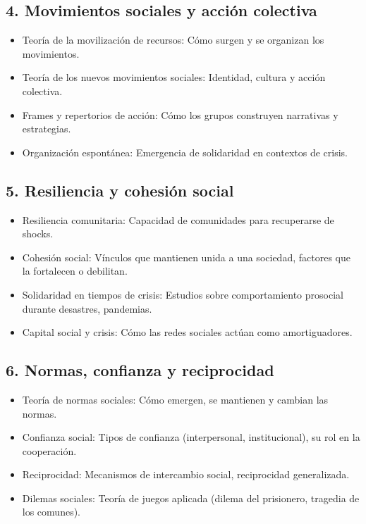 \documentclass[a4paper,11pt]{article}
\begin{document}
\subsection*{4. Movimientos sociales y acción colectiva}
\begin{itemize}[leftmargin=*, label=--]
    \item Teoría de la movilización de recursos: Cómo surgen y se organizan los movimientos.
    \item Teoría de los nuevos movimientos sociales: Identidad, cultura y acción colectiva.
    \item Frames y repertorios de acción: Cómo los grupos construyen narrativas y estrategias.
    \item Organización espontánea: Emergencia de solidaridad en contextos de crisis.
\end{itemize}

\subsection*{5. Resiliencia y cohesión social}
\begin{itemize}[leftmargin=*, label=--]
    \item Resiliencia comunitaria: Capacidad de comunidades para recuperarse de shocks.
    \item Cohesión social: Vínculos que mantienen unida a una sociedad, factores que la fortalecen o debilitan.
    \item Solidaridad en tiempos de crisis: Estudios sobre comportamiento prosocial durante desastres, pandemias.
    \item Capital social y crisis: Cómo las redes sociales actúan como amortiguadores.
\end{itemize}

\subsection*{6. Normas, confianza y reciprocidad}
\begin{itemize}[leftmargin=*, label=--]
    \item Teoría de normas sociales: Cómo emergen, se mantienen y cambian las normas.
    \item Confianza social: Tipos de confianza (interpersonal, institucional), su rol en la cooperación.
    \item Reciprocidad: Mecanismos de intercambio social, reciprocidad generalizada.
    \item Dilemas sociales: Teoría de juegos aplicada (dilema del prisionero, tragedia de los comunes).
\end{itemize}
\end{document}
